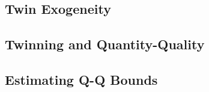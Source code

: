\subsection{Twin Exogeneity}
\label{TWINsscn:twinRes}


\subsection{Twinning and Quantity-Quality}
\label{TWINsscn:QQRes}


\subsection{Estimating Q-Q Bounds}
\label{TWINsscn:boundsRes}

